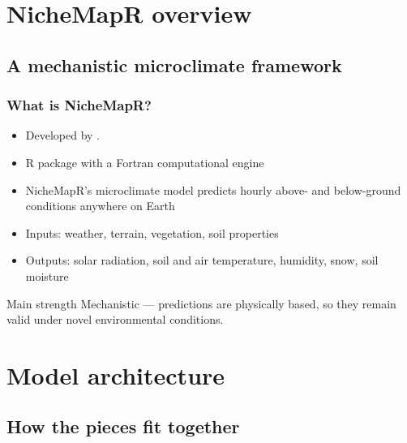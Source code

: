 \documentclass{beamer}
\begin{document}
\section{NicheMapR overview}
\subsection{A mechanistic microclimate framework}

\begin{frame}
  \frametitle{What is NicheMapR?}

  \begin{itemize}
    \item Developed by \textcite{kearney2017a}.
    \item R package with a Fortran computational engine
    \item NicheMapR's microclimate model predicts hourly above- and below-ground conditions anywhere on Earth
    \item Inputs: weather, terrain, vegetation, soil properties
    \item Outputs: solar radiation, soil and air temperature, humidity, snow, soil moisture
  \end{itemize}

  \vspace{0.3cm}

  \begin{block}{Main strength}
    Mechanistic --- predictions are physically based, so they remain valid under novel environmental conditions.
  \end{block}
\end{frame}

\section{Model architecture}
\subsection{How the pieces fit together}
\end{document}

